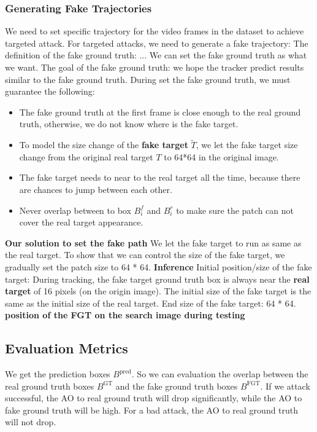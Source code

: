 \documentclass{article}
\begin{document}
\subsubsection{Generating Fake Trajectories}

We need to set specific trajectory for the video frames in the dataset to achieve targeted attack.
For targeted attacks, we need to generate a fake trajectory: The definition of the fake ground truth: ... We can set the fake ground truth as what we want.
The goal of the fake ground truth: we hope the tracker predict results similar to the fake ground truth.
During set the fake ground truth, we must guarantee the following:

\begin{itemize}
\item The fake ground truth at the first frame is close enough to the real ground truth, otherwise, we do not know where is the fake target.
\item To model the size change of the \textbf{fake target} $\tilde T$, we let the fake target size change from the original real target $T$ to 64*64 in the original image.
\item The fake target needs to near to the real target all the time, because there are chances to jump between each other.
\item Never overlap between to box $B^f_i$ and $B^r_i$ to make sure the patch can not cover the real target appearance.
\end{itemize}

\textbf{Our solution to set the fake path} We let the fake target to run as same as the real target. To show that we can control the size of the fake target, we gradually set the patch size to 64 * 64.
\textbf{Inference} 
Initial position/size of the fake target: During tracking, the fake target ground truth box is always near the \textbf{real target} of 16 pixels (on the origin image).
The initial size of the fake target is the same as the initial size of the real target.
End size of the fake target: 64 * 64.
\textbf {position of the FGT on the search image during testing}

\subsection{Evaluation Metrics}

We get the prediction boxes $B^{\text{pred}}$. So we can evaluation the overlap between the real ground truth boxes $B^{\text{GT}}$ and the fake ground truth boxes $B^{\text{FGT}}$. If we attack successful, the AO to real ground truth will drop significantly, while the AO to fake ground truth will be high. For a bad attack, the AO to real ground truth will not drop. 
\end{document}
